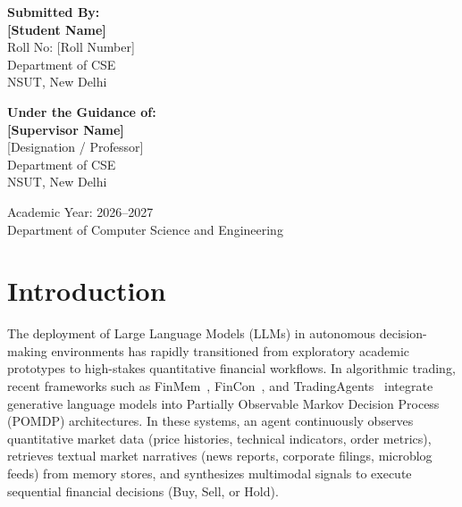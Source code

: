 \documentclass[11pt,a4paper]{article}
\begin{document}
\begin{titlepage}
    \begin{minipage}{0.45\textwidth}
        \begin{flushleft} \large
            \textbf{Submitted By:}\\[0.2cm]
            \textbf{[Student Name]}\\[0.1cm]
            Roll No: [Roll Number]\\[0.1cm]
            Department of CSE\\[0.1cm]
            NSUT, New Delhi
        \end{flushleft}
    \end{minipage}
    \hfill
    \begin{minipage}{0.45\textwidth}
        \begin{flushright} \large
            \textbf{Under the Guidance of:}\\[0.2cm]
            \textbf{[Supervisor Name]}\\[0.1cm]
            [Designation / Professor]\\[0.1cm]
            Department of CSE\\[0.1cm]
            NSUT, New Delhi
        \end{flushright}
    \end{minipage}
    
    \vfill
    {\large Academic Year: 2026--2027}\\[0.2cm]
    {\normalsize Department of Computer Science and Engineering}
\end{titlepage}

\newpage
{}
\tableofcontents
\newpage
{}

\section{Introduction}
\label{sec:introduction}

The deployment of Large Language Models (LLMs) in autonomous decision-making environments has rapidly transitioned from exploratory academic prototypes to high-stakes quantitative financial workflows. In algorithmic trading, recent frameworks such as FinMem~\cite{yu2025finmem}, FinCon~\cite{yu2024fincon}, and TradingAgents~\cite{xiao2025tradingagents} integrate generative language models into Partially Observable Markov Decision Process (POMDP) architectures. In these systems, an agent continuously observes quantitative market data (price histories, technical indicators, order metrics), retrieves textual market narratives (news reports, corporate filings, microblog feeds) from memory stores, and synthesizes multimodal signals to execute sequential financial decisions (Buy, Sell, or Hold).
\end{document}
